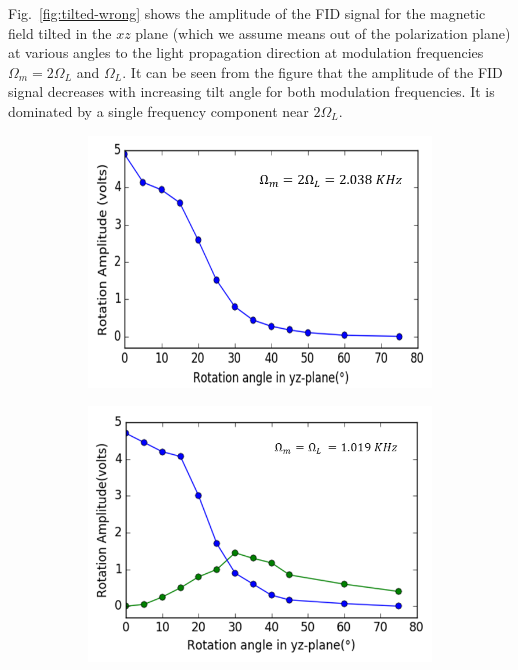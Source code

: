 Fig.~\ref{fig:tilted-wrong} shows the amplitude of the FID signal for
the magnetic field tilted in the $xz$ plane (which we assume means out
of the polarization plane) at various angles to the light propagation
direction at modulation frequencies $\Omega_m=2\Omega_L$ and
$\Omega_L$. It can be seen from the figure that the amplitude of the
FID signal decreases with increasing tilt angle for both modulation
frequencies.  It is dominated by a single frequency component near
$2\Omega_L$.

\begin{figure}
  \centering
  \begin{subfigure}[b]{0.49\textwidth}
    \includegraphics[width=\textwidth]{figures/tilt_y_larmor.png}
    \caption{}
    \label{fig:tilt_y}
  \end{subfigure}
  \hfill
  \begin{subfigure}[b]{0.49\textwidth}
    \centering
    \includegraphics[width=\textwidth]{figures/tilt_y_2larmor.png}

\end{subfigure}
\end{figure}
